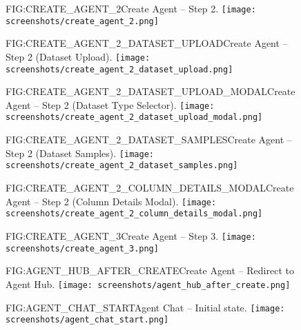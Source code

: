 \begin{figure}[Create Agent -- Step 2]{FIG:CREATE_AGENT_2}{Create Agent -- Step 2.}
    \texttt{[image: screenshots/create\_agent\_2.png]}
\end{figure}

\begin{figure}[Create Agent -- Step 2 (Dataset Upload)]{FIG:CREATE_AGENT_2_DATASET_UPLOAD}{Create Agent -- Step 2 (Dataset Upload).}
    \texttt{[image: screenshots/create\_agent\_2\_dataset\_upload.png]}
\end{figure}

\begin{figure}[Create Agent -- Step 2 (Dataset Type Selector)]{FIG:CREATE_AGENT_2_DATASET_UPLOAD_MODAL}{Create Agent -- Step 2 (Dataset Type Selector).}
    \texttt{[image: screenshots/create\_agent\_2\_dataset\_upload\_modal.png]}
\end{figure}

\begin{figure}[Create Agent -- Step 2 (Dataset Samples)]{FIG:CREATE_AGENT_2_DATASET_SAMPLES}{Create Agent -- Step 2 (Dataset Samples).}
    \texttt{[image: screenshots/create\_agent\_2\_dataset\_samples.png]}
\end{figure}

\begin{figure}[Create Agent -- Step 2 (Column Details Modal)]{FIG:CREATE_AGENT_2_COLUMN_DETAILS_MODAL}{Create Agent -- Step 2 (Column Details Modal).}
    \texttt{[image: screenshots/create\_agent\_2\_column\_details\_modal.png]}
\end{figure}

\begin{figure}[Create Agent -- Step 3]{FIG:CREATE_AGENT_3}{Create Agent -- Step 3.}
    \texttt{[image: screenshots/create\_agent\_3.png]}
\end{figure}

\begin{figure}[Create Agent -- Redirect to Agent Hub]{FIG:AGENT_HUB_AFTER_CREATE}{Create Agent -- Redirect to Agent Hub.}
    \texttt{[image: screenshots/agent\_hub\_after\_create.png]}
\end{figure}

\begin{figure}[Agent Chat -- Initial state]{FIG:AGENT_CHAT_START}{Agent Chat -- Initial state.}
    \texttt{[image: screenshots/agent\_chat\_start.png]}
\end{figure}

